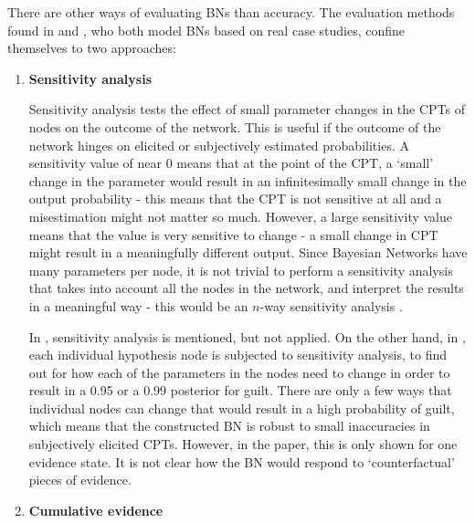 \documentclass[11pt]{article}
\begin{document}
There are other ways of evaluating BNs than accuracy. The evaluation methods found in \citet{Fenton2019} and \citet{vlek2016}, who both model BNs based on real case studies, confine themselves to two approaches:

\begin{enumerate}

\item \textbf{Sensitivity analysis}

Sensitivity analysis tests the effect of small parameter changes in the CPTs of nodes on the outcome of the network. This is useful if the outcome of the network hinges on elicited or subjectively estimated probabilities. A sensitivity value of near 0 means that at the point of the CPT, a `small' change in the parameter would result in an infinitesimally small change in the output probability - this means that the CPT is not sensitive at all and a misestimation might not matter so much. However, a large sensitivity value means that the value is very sensitive to change - a small change in CPT might result in a meaningfully different output.  Since Bayesian Networks have many parameters per node, it is not trivial to perform a sensitivity analysis that takes into account all the nodes in the network, and interpret the results in a meaningful way - this would be an $n$-way sensitivity analysis \citep{gaag2007}.  

In \citet{vlek2016}, sensitivity analysis is mentioned, but not applied. On the other hand, in \citet{Fenton2019}, each individual hypothesis node is subjected to sensitivity analysis, to find out for how each of the parameters in the nodes need to change in order to result in a 0.95 or a 0.99 posterior for guilt. There are only a few ways that individual nodes can change that would result in a high probability of guilt, which means that the constructed BN is robust to small inaccuracies in subjectively elicited CPTs. However, in the paper, this is only shown for one evidence state. It is not clear how the BN would respond to `counterfactual' pieces of evidence.


\item \textbf{Cumulative evidence}


\end{enumerate}
\end{document}
